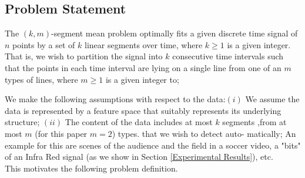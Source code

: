 \documentclass{vldb}
\begin{document}
\subsection{Problem Statement} \label{Problem Statement}
The $(k,m)$-segment mean problem optimally fits a given discrete time signal of $n$ points
by a set of $k$ linear segments over time,
where $k\geq1$ is a given integer. That is, we wish to
partition the signal into $k$ consecutive time intervals such that the points in each time
interval are lying on a single line from one of an $m$ types of lines, where $m\geq1$ is a given integer to;

We make the following assumptions with respect to the data:$(i)$ We assume the
data is represented by a feature space that suitably represents its underlying structure;
$(ii)$ The content of the data includes at most $k$ segments ,from at most $m$ (for this paper $m=2$) types. that we wish to detect auto-
matically; An example for this are scenes of the audience and the field in a soccer video, a "bits" of an Infra Red signal (as we show in Section \ref{Experimental Results}), etc. \\
This motivates the following problem definition.
\end{document}
